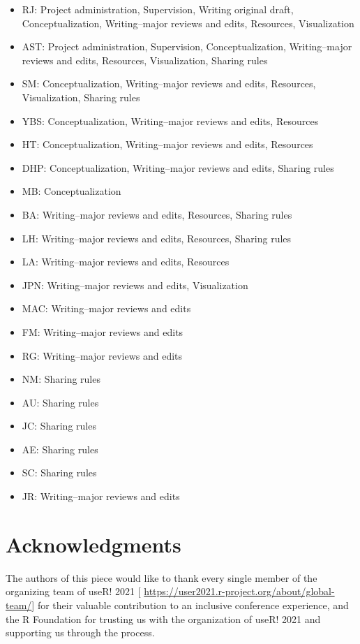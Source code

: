 \documentclass[10pt,letterpaper]{article}
\begin{document}
\begin{itemize}
    \item RJ: Project administration, Supervision, Writing original draft, Conceptualization, Writing--major reviews and edits, Resources, Visualization
    \item AST: Project administration, Supervision, Conceptualization,  Writing--major reviews and edits, Resources, Visualization, Sharing rules
    \item SM: Conceptualization, Writing--major reviews and edits, Resources, Visualization, Sharing rules
    \item YBS: Conceptualization, Writing--major reviews and edits, Resources
    \item HT: Conceptualization, Writing--major reviews and edits, Resources
    \item DHP: Conceptualization, Writing--major reviews and edits, Sharing rules
    \item MB: Conceptualization
    \item BA: Writing--major reviews and edits, Resources, Sharing rules
    \item LH: Writing--major reviews and edits, Resources, Sharing rules
    \item LA: Writing--major reviews and edits, Resources
    \item JPN: Writing--major reviews and edits, Visualization
    \item MAC: Writing--major reviews and edits
    \item FM: Writing--major reviews and edits
    \item RG: Writing--major reviews and edits
    \item NM: Sharing rules
    \item AU: Sharing rules
    \item JC: Sharing rules
    \item AE: Sharing rules
    \item SC: Sharing rules
    \item JR: Writing--major reviews and edits
\end{itemize}



\section*{Acknowledgments}
The authors of this piece would like to thank every single member of the organizing team of useR! 2021 [ \url{https://user2021.r-project.org/about/global-team/}] for their valuable contribution to an inclusive conference experience, and the R Foundation for trusting us with the organization of useR! 2021 and supporting us through the process. 
\end{document}
